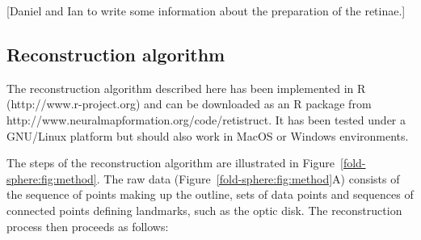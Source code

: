 \documentclass[10pt]{article}
\newcommand{\todo}[1]{{\color{red}[#1]}}
\begin{document}
\todo{Daniel and Ian to write some information about the preparation
  of the retinae.}

\subsection*{Reconstruction algorithm}
\label{retistruct_plos:sec:reconstr-algor}

The reconstruction algorithm described here has been implemented in R
(http://www.r-project.org) and can be downloaded as an R package from
http://www.neuralmapformation.org/code/retistruct. It has been tested
under a GNU/Linux platform but should also work in MacOS or Windows
environments.

The steps of the reconstruction algorithm are illustrated in
Figure~\ref{fold-sphere:fig:method}. The raw data
(Figure~\ref{fold-sphere:fig:method}A) consists of the sequence of
points making up the outline, sets of data points and sequences of
connected points defining landmarks, such as the optic disk. The
reconstruction process then proceeds as follows:
\end{document}
